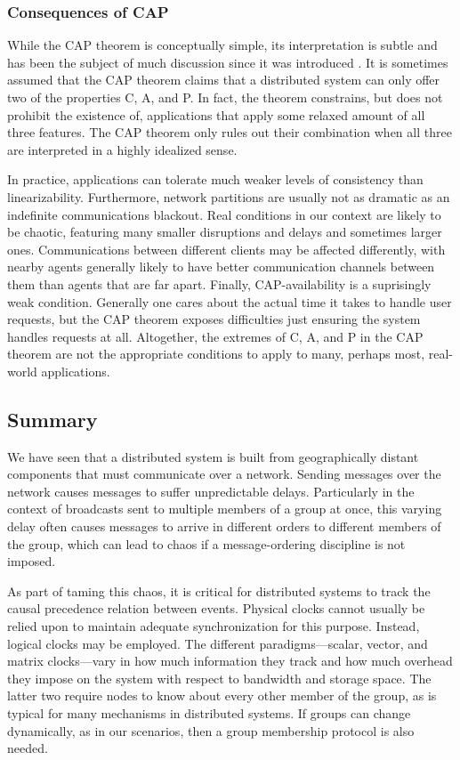 \documentclass[]             %
{NASA}                       %
\theoremstyle{definition}
\begin{document}
\subsubsection{Consequences of CAP}
\label{interpretation-of-the-cap-theorem}
While the CAP theorem is conceptually simple, its interpretation is
subtle and has been the subject of much discussion since it was
introduced \cite{2012CAP12Years}. It is sometimes assumed that the CAP
theorem claims that a distributed system can only offer two of the
properties C, A, and P.  In fact, the theorem constrains, but does not
prohibit the existence of, applications that apply some relaxed amount
of all three features. The CAP theorem only rules out their
combination when all three are interpreted in a highly idealized
sense.

In practice, applications can tolerate much weaker levels of
consistency than linearizability. Furthermore, network partitions are
usually not as dramatic as an indefinite communications blackout. Real
conditions in our context are likely to be chaotic, featuring many
smaller disruptions and delays and sometimes larger
ones. Communications between different clients may be affected
differently, with nearby agents generally likely to have better
communication channels between them than agents that are far
apart. Finally, CAP-availability is a suprisingly weak condition.
Generally one cares about the actual time it takes to handle user
requests, but the CAP theorem exposes difficulties just ensuring the
system handles requests at all. Altogether, the extremes of C, A, and
P in the CAP theorem are not the appropriate conditions to apply to
many, perhaps most, real-world applications.

\subsection{Summary}
\label{sec:background-summary}

We have seen that a distributed system is built from geographically
distant components that must communicate over a network. Sending
messages over the network causes messages to suffer unpredictable
delays. Particularly in the context of broadcasts sent to multiple
members of a group at once, this varying delay often causes messages
to arrive in different orders to different members of the group, which
can lead to chaos if a message-ordering discipline is not imposed.

As part of taming this chaos, it is critical for distributed systems
to track the causal precedence relation between events. Physical
clocks cannot usually be relied upon to maintain adequate
synchronization for this purpose. Instead, logical clocks may be
employed. The different paradigms---scalar, vector, and matrix
clocks---vary in how much information they track and how much overhead
they impose on the system with respect to bandwidth and storage
space. The latter two require nodes to know about every other member
of the group, as is typical for many mechanisms in distributed
systems. If groups can change dynamically, as in our scenarios, then a
group membership protocol is also needed.
\end{document}

